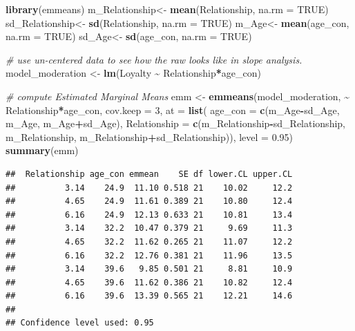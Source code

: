 \documentclass[
]{ctexart}
\newenvironment{Shaded}{\begin{snugshade}}{\end{snugshade}}
\newcommand{\AttributeTok}[1]{\textcolor[rgb]{0.13,0.29,0.53}{#1}}
\newcommand{\CommentTok}[1]{\textcolor[rgb]{0.56,0.35,0.01}{\textit{#1}}}
\newcommand{\ConstantTok}[1]{\textcolor[rgb]{0.56,0.35,0.01}{#1}}
\newcommand{\DecValTok}[1]{\textcolor[rgb]{0.00,0.00,0.81}{#1}}
\newcommand{\FloatTok}[1]{\textcolor[rgb]{0.00,0.00,0.81}{#1}}
\newcommand{\FunctionTok}[1]{\textcolor[rgb]{0.13,0.29,0.53}{\textbf{#1}}}
\newcommand{\NormalTok}[1]{#1}
\newcommand{\OtherTok}[1]{\textcolor[rgb]{0.56,0.35,0.01}{#1}}
\newcommand{\SpecialCharTok}[1]{\textcolor[rgb]{0.81,0.36,0.00}{\textbf{#1}}}
\begin{document}
\begin{Shaded}
\begin{Highlighting}[]
\FunctionTok{library}\NormalTok{(emmeans)}
\NormalTok{m\_Relationship}\OtherTok{\textless{}{-}} \FunctionTok{mean}\NormalTok{(Relationship, }\AttributeTok{na.rm =} \ConstantTok{TRUE}\NormalTok{)}
\NormalTok{sd\_Relationship}\OtherTok{\textless{}{-}} \FunctionTok{sd}\NormalTok{(Relationship, }\AttributeTok{na.rm =} \ConstantTok{TRUE}\NormalTok{)}
\NormalTok{m\_Age}\OtherTok{\textless{}{-}} \FunctionTok{mean}\NormalTok{(age\_con, }\AttributeTok{na.rm =} \ConstantTok{TRUE}\NormalTok{)}
\NormalTok{sd\_Age}\OtherTok{\textless{}{-}} \FunctionTok{sd}\NormalTok{(age\_con, }\AttributeTok{na.rm =} \ConstantTok{TRUE}\NormalTok{)}

\CommentTok{\# use un{-}centered data to see how the raw looks like in slope analysis.}
\NormalTok{model\_moderation }\OtherTok{\textless{}{-}} \FunctionTok{lm}\NormalTok{(Loyalty }\SpecialCharTok{\textasciitilde{}}\NormalTok{ Relationship}\SpecialCharTok{*}\NormalTok{age\_con)}

\CommentTok{\# compute Estimated Marginal Means}
\NormalTok{emm }\OtherTok{\textless{}{-}} \FunctionTok{emmeans}\NormalTok{(model\_moderation,  }\SpecialCharTok{\textasciitilde{}}\NormalTok{ Relationship}\SpecialCharTok{*}\NormalTok{age\_con, }
               \AttributeTok{cov.keep =} \DecValTok{3}\NormalTok{, }
               \AttributeTok{at =} \FunctionTok{list}\NormalTok{( }
                 \AttributeTok{age\_con =} \FunctionTok{c}\NormalTok{(m\_Age}\SpecialCharTok{{-}}\NormalTok{sd\_Age, m\_Age, m\_Age}\SpecialCharTok{+}\NormalTok{sd\_Age), }
                 \AttributeTok{Relationship =} \FunctionTok{c}\NormalTok{(m\_Relationship}\SpecialCharTok{{-}}\NormalTok{sd\_Relationship, }
\NormalTok{                                  m\_Relationship, }
\NormalTok{                                  m\_Relationship}\SpecialCharTok{+}\NormalTok{sd\_Relationship)), }
               \AttributeTok{level =} \FloatTok{0.95}\NormalTok{)}
\FunctionTok{summary}\NormalTok{(emm)}
\end{Highlighting}
\end{Shaded}

\begin{verbatim}
##  Relationship age_con emmean    SE df lower.CL upper.CL
##          3.14    24.9  11.10 0.518 21    10.02     12.2
##          4.65    24.9  11.61 0.389 21    10.80     12.4
##          6.16    24.9  12.13 0.633 21    10.81     13.4
##          3.14    32.2  10.47 0.379 21     9.69     11.3
##          4.65    32.2  11.62 0.265 21    11.07     12.2
##          6.16    32.2  12.76 0.381 21    11.96     13.5
##          3.14    39.6   9.85 0.501 21     8.81     10.9
##          4.65    39.6  11.62 0.386 21    10.82     12.4
##          6.16    39.6  13.39 0.565 21    12.21     14.6
## 
## Confidence level used: 0.95
\end{verbatim}
\end{document}
